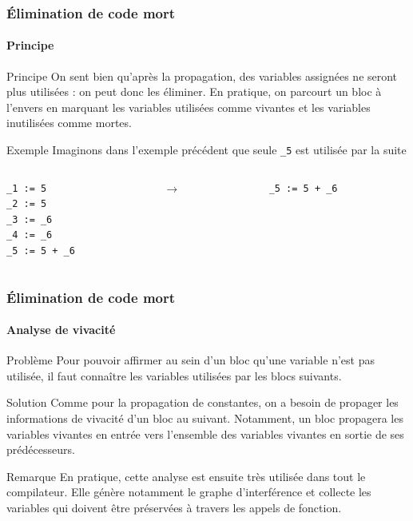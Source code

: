 \documentclass{beamer}
\begin{document}
\begin{frame}[fragile]
    \frametitle{Élimination de code mort}
    \framesubtitle{Principe}
    
    \begin{block}{Principe}
        On sent bien qu'après la propagation, des variables assignées ne seront plus
        utilisées : on peut donc les éliminer. En pratique, on parcourt un bloc
        à l'envers en marquant les variables utilisées comme vivantes et les variables 
        inutilisées comme mortes.
    \end{block}
    \pause
    \begin{exampleblock}{Exemple}
        Imaginons dans l'exemple précédent que seule \lstinline{_5} est utilisée par la suite
         \begin{columns}
            \begin{column}{.40\textwidth}
                    \begin{lstlisting}
_1 := 5
_2 := 5
_3 := _6
_4 := _6
_5 := 5 + _6
                    \end{lstlisting}
            \end{column}
            \pause
            \begin{column}{.04\textwidth}
                $\rightarrow$
            \end{column}
            \begin{column}{.40\textwidth}
                    \begin{lstlisting}
_5 := 5 + _6

                    \end{lstlisting}
            \end{column}
        \end{columns}       
    \end{exampleblock}
\end{frame}

\begin{frame}
    \frametitle{Élimination de code mort}
    \framesubtitle{Analyse de vivacité}
    \begin{alertblock}{Problème}
        Pour pouvoir affirmer au sein d'un bloc qu'une variable n'est pas utilisée,
        il faut connaître les variables utilisées par les blocs suivants. 
    \end{alertblock}
    \pause
    \begin{block}{Solution}
        Comme pour la propagation de constantes, on a besoin de propager les informations
        de vivacité d'un bloc au suivant. Notamment, un bloc propagera les variables
        vivantes en entrée vers l'ensemble des variables vivantes en sortie de ses
        prédécesseurs.
    \end{block}
    \pause
    \begin{block}{Remarque}
        En pratique, cette analyse est ensuite très utilisée dans tout le compilateur.
        Elle génère notamment le graphe d'interférence et collecte les variables qui doivent
        être préservées à travers les appels de fonction.
    \end{block}
\end{frame}
\end{document}
